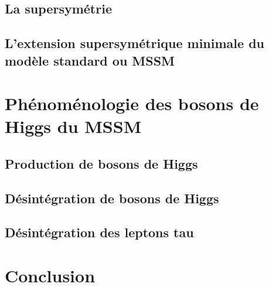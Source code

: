 \subsection{La supersymétrie}
\subsection{L'extension supersymétrique minimale du modèle standard ou MSSM}

\section{Phénoménologie des bosons de Higgs du MSSM}
\subsection{Production de bosons de Higgs}
\subsection{Désintégration de bosons de Higgs}
\subsection{Désintégration des leptons tau}

\section{Conclusion}